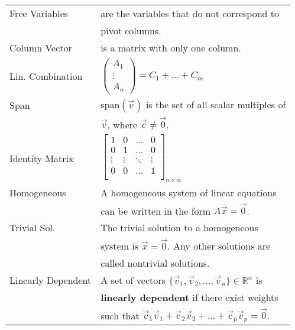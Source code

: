 \documentclass[5pt]{article}
\begin{document}
\begin{multicols}{2}
\begin{tabular}{ll}
    Free Variables          & are the variables that do not correspond to\\
                            & pivot columns.\\
    Column Vector           & is a matrix with only one column.\\
    Lin. Combination        & \footnotesize{$\begin{pmatrix}A_1\\ \vdots\\ A_n\end{pmatrix}=C_1 + ... + C_m$}\\
    Span                    & $\text{span}(\vec{v})$ is the set of all scalar multiples of\\
                            & $\vec{v}$, where $\vec{c}\neq\vec{0}$. \\
    Identity Matrix         & \footnotesize{$\begin{bmatrix}
                                  1 & 0 & ... & 0 \\
                                  0 & 1 & ... & 0 \\
                                  \vdots & \vdots & \ddots & \vdots \\
                                  0 & 0 & ... & 1 \\
                                \end{bmatrix}_{n\times n}$}\\
   Homogeneous              & A homogeneous system of linear equations\\
                            & can be written in the form $A\vec{x}=\vec{0}$.\\
   Trivial Sol.             & The trivial solution to a homogeneous\\
                            & system is $\vec{x}=\vec{0}$. Any other solutions are\\
                            & called nontrivial solutions.\\
\small{Linearly Dependent}  & A set of vectors $\{\vec{v}_1, \vec{v}_2, ..., \vec{v}_n\}\in\mathbb{R}^n$ is\\
                            & \textbf{linearly dependent} if there exist weights\\
                            & such that $\vec{c}_1\vec{v}_1 + \vec{c}_2\vec{v}_2 + ... + \vec{c}_p\vec{v}_p=\vec{0}$.\\
\end{tabular}
\begin{tabular}{ll}

\end{tabular}
\end{multicols}
\end{document}
